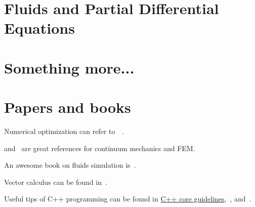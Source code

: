 \documentclass{fancydoc}
\begin{document}
\section{Fluids and Partial Differential Equations}

\section{Something more...}

\section{Papers and books}

Numerical optimization can refer to~\cite{boyd2004convex}~\cite{nocedal2006numerical}.

\cite{bonet1997nonlinear} and~\cite{sifakis2012fem} are great references for continuum mechanics and FEM.

An awesome book on fluids simulation is~\cite{bridson2015fluid}.

Vector calculus can be found in~\cite{petersen2008matrix}.

Useful tips of C++ programming can be found in \href{https://github.com/isocpp/CppCoreGuidelines}{C++ core guidelines},~\cite{meyers2005effective}, and~\cite{meyers2014effective}.


 
\end{document}
